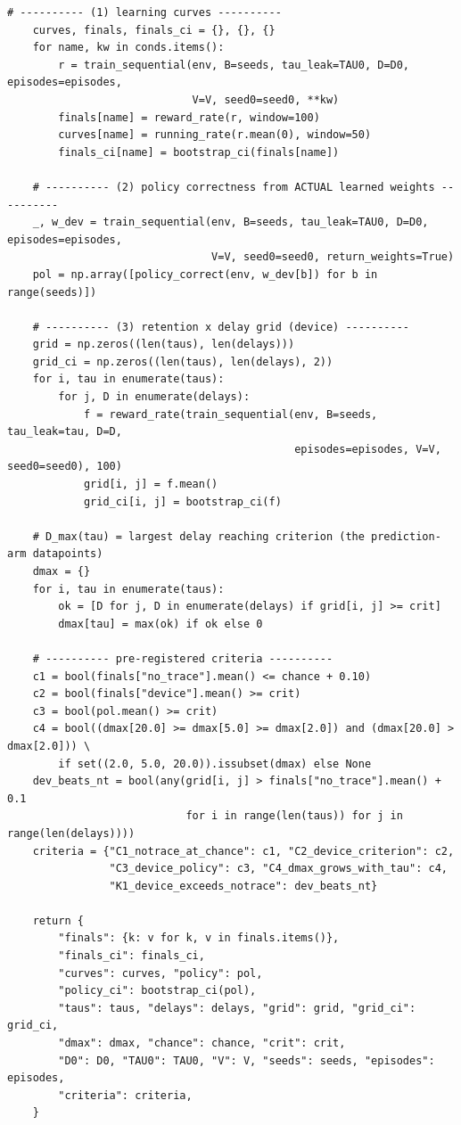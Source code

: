 \begin{lstlisting}[caption={mrl\_trace/maze.py},label={lst:siox-src-maze}]
    # ---------- (1) learning curves ----------
    curves, finals, finals_ci = {}, {}, {}
    for name, kw in conds.items():
        r = train_sequential(env, B=seeds, tau_leak=TAU0, D=D0, episodes=episodes,
                             V=V, seed0=seed0, **kw)
        finals[name] = reward_rate(r, window=100)
        curves[name] = running_rate(r.mean(0), window=50)
        finals_ci[name] = bootstrap_ci(finals[name])

    # ---------- (2) policy correctness from ACTUAL learned weights ----------
    _, w_dev = train_sequential(env, B=seeds, tau_leak=TAU0, D=D0, episodes=episodes,
                                V=V, seed0=seed0, return_weights=True)
    pol = np.array([policy_correct(env, w_dev[b]) for b in range(seeds)])

    # ---------- (3) retention x delay grid (device) ----------
    grid = np.zeros((len(taus), len(delays)))
    grid_ci = np.zeros((len(taus), len(delays), 2))
    for i, tau in enumerate(taus):
        for j, D in enumerate(delays):
            f = reward_rate(train_sequential(env, B=seeds, tau_leak=tau, D=D,
                                             episodes=episodes, V=V, seed0=seed0), 100)
            grid[i, j] = f.mean()
            grid_ci[i, j] = bootstrap_ci(f)

    # D_max(tau) = largest delay reaching criterion (the prediction-arm datapoints)
    dmax = {}
    for i, tau in enumerate(taus):
        ok = [D for j, D in enumerate(delays) if grid[i, j] >= crit]
        dmax[tau] = max(ok) if ok else 0

    # ---------- pre-registered criteria ----------
    c1 = bool(finals["no_trace"].mean() <= chance + 0.10)
    c2 = bool(finals["device"].mean() >= crit)
    c3 = bool(pol.mean() >= crit)
    c4 = bool((dmax[20.0] >= dmax[5.0] >= dmax[2.0]) and (dmax[20.0] > dmax[2.0])) \
        if set((2.0, 5.0, 20.0)).issubset(dmax) else None
    dev_beats_nt = bool(any(grid[i, j] > finals["no_trace"].mean() + 0.1
                            for i in range(len(taus)) for j in range(len(delays))))
    criteria = {"C1_notrace_at_chance": c1, "C2_device_criterion": c2,
                "C3_device_policy": c3, "C4_dmax_grows_with_tau": c4,
                "K1_device_exceeds_notrace": dev_beats_nt}

    return {
        "finals": {k: v for k, v in finals.items()},
        "finals_ci": finals_ci,
        "curves": curves, "policy": pol,
        "policy_ci": bootstrap_ci(pol),
        "taus": taus, "delays": delays, "grid": grid, "grid_ci": grid_ci,
        "dmax": dmax, "chance": chance, "crit": crit,
        "D0": D0, "TAU0": TAU0, "V": V, "seeds": seeds, "episodes": episodes,
        "criteria": criteria,
    }



\end{lstlisting}
